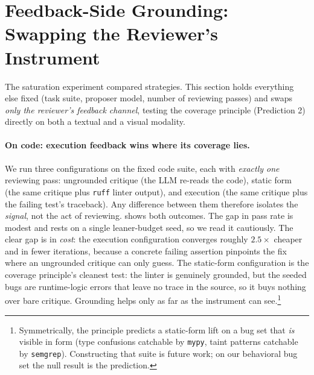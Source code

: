 \section{Feedback-Side Grounding: Swapping the Reviewer's Instrument}
\label{sec:feedback}

The saturation experiment compared strategies. This section holds everything else fixed (task suite, proposer model, number of reviewing passes) and swaps \emph{only the reviewer's feedback channel}, testing the coverage principle (Prediction 2) directly on both a textual and a visual modality.

\paragraph{On code: execution feedback wins where its coverage lies.} We run three configurations on the fixed code suite, each with \emph{exactly one} reviewing pass: ungrounded critique (the LLM re-reads the code), static form (the same critique plus \texttt{ruff} linter output), and execution (the same critique plus the failing test's traceback). Any difference between them therefore isolates the \emph{signal}, not the act of reviewing.  shows both outcomes. The gap in pass rate is modest and rests on a single leaner-budget seed, so we read it cautiously. The clear gap is in \emph{cost}: the execution configuration converges roughly $2.5\times$ cheaper and in fewer iterations, because a concrete failing assertion pinpoints the fix where an ungrounded critique can only guess. The static-form configuration is the coverage principle's cleanest test: the linter is genuinely grounded, but the seeded bugs are runtime-logic errors that leave no trace in the source, so it buys nothing over bare critique. Grounding helps only as far as the instrument can see.\footnote{Symmetrically, the principle predicts a static-form lift on a bug set that \emph{is} visible in form (type confusions catchable by \texttt{mypy}, taint patterns catchable by \texttt{semgrep}). Constructing that suite is future work; on our behavioral bug set the null result is the prediction.}

